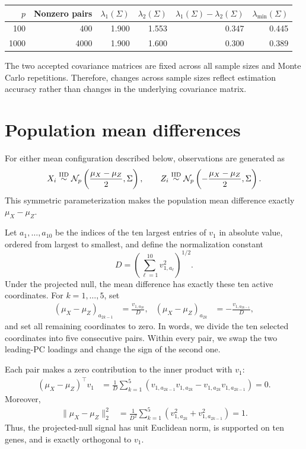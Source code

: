 \documentclass[11pt]{article}
\begin{document}
\begin{center}
\begin{tabular}{rrrrrr}
\toprule
$p$ & Nonzero pairs & $\lambda_1(\Sigma)$
& $\lambda_2(\Sigma)$ & $\lambda_1(\Sigma)-\lambda_2(\Sigma)$
& $\lambda_{\min}(\Sigma)$ \\
\midrule
100  & 400  & 1.900 & 1.553 & 0.347 & 0.445 \\
1000 & 4000 & 1.900 & 1.600 & 0.300 & 0.389 \\
\bottomrule
\end{tabular}
\end{center}

The two accepted covariance matrices are fixed across all sample sizes and
Monte Carlo repetitions. Therefore, changes across sample sizes reflect
estimation accuracy rather than changes in the underlying covariance matrix.


\section{Population mean differences}

For either mean configuration described below, observations are generated as
\[
X_i\overset{\rm IID}{\sim}
\mathcal N_p\left(\frac{\mu_X-\mu_Z}{2},\Sigma\right),
\qquad
Z_i\overset{\rm IID}{\sim}
\mathcal N_p\left(-\frac{\mu_X-\mu_Z}{2},\Sigma\right).
\]
This symmetric parameterization makes the population mean difference exactly
$\mu_X-\mu_Z$.

Let $a_1,\ldots,a_{10}$ be the indices of the ten largest entries of $v_1$
in absolute value, ordered from largest to smallest, and define the
normalization constant
\[
D=\left(\sum_{\ell=1}^{10}v_{1,a_\ell}^2\right)^{1/2}.
\]
Under the projected null, the mean difference has exactly these ten active
coordinates. For $k=1,\ldots,5$, set
\begin{align}
\left(\mu_X-\mu_Z\right)_{a_{2k-1}}
&=\frac{v_{1,a_{2k}}}{D},
&
\left(\mu_X-\mu_Z\right)_{a_{2k}}
&=-\frac{v_{1,a_{2k-1}}}{D},
\label{eq:projected-null-mean}
\end{align}
and set all remaining coordinates to zero. In words, we divide the ten
selected coordinates into five consecutive pairs. Within every pair, we swap
the two leading-PC loadings and change the sign of the second one.

Each pair makes a zero contribution to the inner product with $v_1$:
\begin{align*}
\left(\mu_X-\mu_Z\right)^\top v_1
&=
\frac{1}{D}\sum_{k=1}^5
\left(
v_{1,a_{2k-1}}v_{1,a_{2k}}
-v_{1,a_{2k}}v_{1,a_{2k-1}}
\right)
=0.
\end{align*}
Moreover,
\begin{align*}
\lVert\mu_X-\mu_Z\rVert_2^2
&=
\frac{1}{D^2}\sum_{k=1}^5
\left(v_{1,a_{2k}}^2+v_{1,a_{2k-1}}^2\right)
=1.
\end{align*}
Thus, the projected-null signal has unit Euclidean norm, is supported on ten
genes, and is exactly orthogonal to $v_1$.
\end{document}
